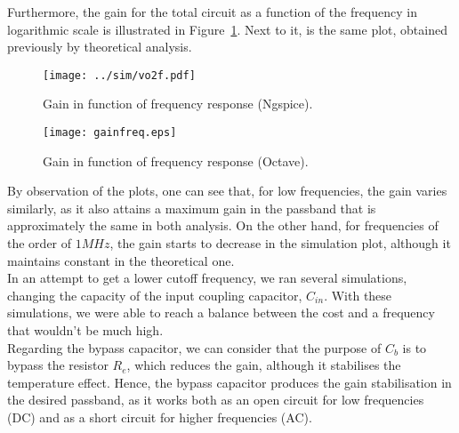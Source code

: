 Furthermore, the gain for the total circuit as a function of the frequency in logarithmic scale is illustrated in Figure~\ref{fig:sim}. Next to it, is the same plot, obtained previously by theoretical analysis.

\vspace{-25mm}

\noindent
\begin{minipage}[c]{0.5\linewidth}

\begin{figure}[H] \centering
\texttt{[image: ../sim/vo2f.pdf]}
\caption{Gain in function of frequency response (Ngspice).}
\label{fig:sim}
\end{figure}

\end{minipage}
\begin{minipage}[c]{0.5\linewidth}

\vspace{16mm}

\begin{figure}[H] \centering
\texttt{[image: gainfreq.eps]}
\caption{Gain in function of frequency response (Octave).}
\label{fig:octave}
\end{figure}

\end{minipage}

\vspace{10mm}

By observation of the plots, one can see that, for low frequencies, the gain varies similarly, as it also attains a maximum gain in the passband that is approximately the same in both analysis. On the other hand, for frequencies of the order of $1MHz$, the gain starts to decrease in the simulation plot, although it maintains constant in the theoretical one. \\

In an attempt to get a lower cutoff frequency, we ran several simulations, changing the capacity of the input coupling capacitor, $C_{in}$. With these simulations, we were able to reach a balance between the cost and a frequency that wouldn't be much high.\\

Regarding the bypass capacitor, we can consider that the purpose of $C_b$ is to bypass the resistor $R_e$, which reduces the gain, although it stabilises the temperature effect. Hence, the bypass capacitor produces the gain stabilisation in the desired passband, as it works both as an open circuit for low frequencies (DC) and as a short circuit for higher frequencies (AC).\\

